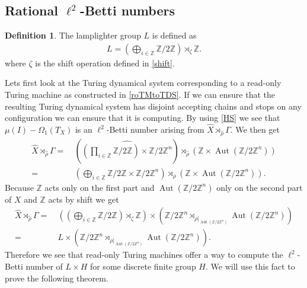 \documentclass[12pt,a4paper]{scrartcl}
\theoremstyle{plain}
\theoremstyle{definition}
\newtheorem{Definition}[Theorem]{Definition}
\numberwithin{equation}{section}
\newcommand{\Z}{\mathbb{Z}} %
\newcommand{\2}{\mathbb{Z} / 2 \mathbb{Z}}
\newcommand{\1}{\bar{1}}
\newcommand{\0}{\bar{0}}
\newcommand{\Aut}{\operatorname{Aut}}
\begin{document}
\subsection{Rational $\ell^2$-Betti numbers}
\begin{Definition}
	The lamplighter group $L$ is defined as
	\begin{align*}
		L = (\bigoplus_{i \in \Z} \2) \rtimes_{\zeta} \Z.
	\end{align*}
	where $\zeta$ is the shift operation defined in \ref{shift}.
\end{Definition}
Lets first look at the Turing dynamical system corresponding to a read-only Turing machine as constructed in \ref{roTMtoTDS}. If we can ensure that the resulting Turing dynamical system has disjoint accepting chains and stops on any configuration we can ensure that it is computing. By using \ref{HS} we see that $\mu (I) - \Omega_1(T_X)$ is an $\ell^2$-Betti number arising from $\hat{X} \rtimes_{\hat{\rho}} \Gamma$. We then get
\begin{align*}
	\hat{X} \rtimes_{\hat{\rho}} \Gamma =&~ (\widehat{(\prod_{i \in \Z} \2) \times \2^n}) \rtimes_{\hat{\rho}} (\Z \times \Aut(\2^n)) \\
	=&~ (\bigoplus_{i \in \Z} \2 \times \2^n) \rtimes_{\rho} (\Z \times \Aut(\2^n)).
\end{align*}
Because $\Z$ acts only on the first part and $\Aut(\2^n)$ only on the second part of $X$ and $\Z$ acts by shift we get
\begin{align*}
	\hat{X} \rtimes_{\hat{\rho}} \Gamma =&~ ((\bigoplus_{i \in \Z} \2) \rtimes_{\zeta} \Z) \times (\2^n \rtimes_{\rho|_{\Aut(\2^n)}} \Aut(\2^n)) \\
	=&~ L \times (\2^n \rtimes_{\rho|_{\Aut(\2^n)}} \Aut(\2^n)).
\end{align*}
Therefore we see that read-only Turing machines offer a way to compute the $\ell^2$-Betti number of $L \times H$ for some discrete finite group $H$. We will use this fact to prove the following theorem.
\end{document}
